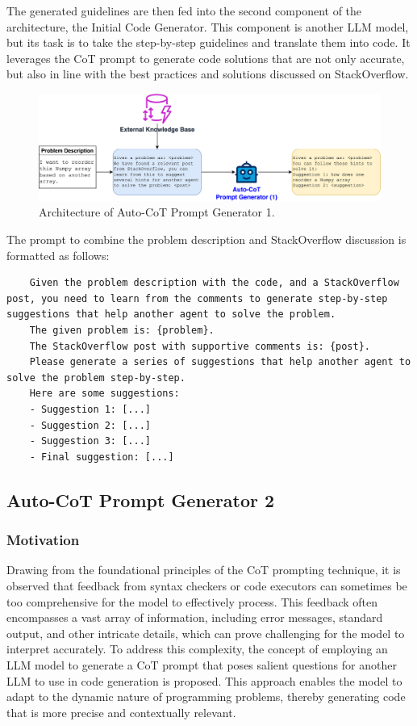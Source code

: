 \documentclass[a4paper,oneside]{book}
\begin{document}
The generated guidelines are then fed into the second component of the architecture, the Initial Code Generator. This component is another LLM model, but its task is to take the step-by-step guidelines and translate them into code. It leverages the CoT prompt to generate code solutions that are not only accurate, but also in line with the best practices and solutions discussed on StackOverflow.

\begin{figure}[H]
  \centering
  \includegraphics[width=1.0\textwidth]{img/cot_generator_1}
  \caption{Architecture of Auto-CoT Prompt Generator 1.}\label{fig:cot_generator_1}
\end{figure}

The prompt to combine the problem description and StackOverflow discussion is formatted as follows:

\begin{lstlisting}
    Given the problem description with the code, and a StackOverflow post, you need to learn from the comments to generate step-by-step suggestions that help another agent to solve the problem.
    The given problem is: {problem}.
    The StackOverflow post with supportive comments is: {post}.
    Please generate a series of suggestions that help another agent to solve the problem step-by-step.
    Here are some suggestions:
    - Suggestion 1: [...]
    - Suggestion 2: [...]
    - Suggestion 3: [...]
    - Final suggestion: [...]
\end{lstlisting}

\subsection{Auto-CoT Prompt Generator 2}
\subsubsection{Motivation}
Drawing from the foundational principles of the CoT prompting technique, it is observed that feedback from syntax checkers or code executors can sometimes be too comprehensive for the model to effectively process. This feedback often encompasses a vast array of information, including error messages, standard output, and other intricate details, which can prove challenging for the model to interpret accurately. To address this complexity, the concept of employing an LLM model to generate a CoT prompt that poses salient questions for another LLM to use in code generation is proposed. This approach enables the model to adapt to the dynamic nature of programming problems, thereby generating code that is more precise and contextually relevant.
\end{document}
